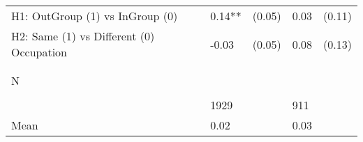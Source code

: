 \begin{tabular}{l*{4}{l}}
H1: OutGroup (1) vs InGroup (0)&     0.14** &   (0.05)&     0.03   &   (0.11)\\
 
H2: Same (1) vs Different (0) Occupation&    -0.03   &   (0.05)&     0.08   &   (0.13)\\
 
  \\\\[-0.5cm] N \\\\[-0.6cm]&     1929   &         &      911   &         \\
Mean            &     0.02&         &     0.03&         \\
 
\bottomrule  \end{tabular}  
